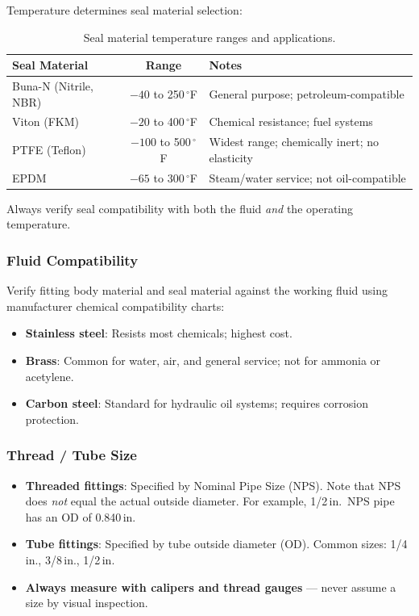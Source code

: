 \documentclass[11pt,letterpaper,twoside,openany]{book}
\begin{document}
Temperature determines seal material selection:

\begin{table}[ht!]
\centering
\small
\begin{tabularx}{\textwidth}{l c X}
  \toprule
  \textbf{Seal Material} & \textbf{Range} & \textbf{Notes} \\
  \midrule
  Buna-N (Nitrile, NBR) & $-40$ to 250\,$^{\circ}$F & General purpose; petroleum-compatible \\
  Viton (FKM) & $-20$ to 400\,$^{\circ}$F & Chemical resistance; fuel systems \\
  PTFE (Teflon) & $-100$ to 500\,$^{\circ}$F & Widest range; chemically inert; no elasticity \\
  EPDM & $-65$ to 300\,$^{\circ}$F & Steam/water service; not oil-compatible \\
  \bottomrule
\end{tabularx}
\caption{Seal material temperature ranges and applications.}
\end{table}

Always verify seal compatibility with both the fluid \emph{and} the operating temperature.

\subsubsection{Fluid Compatibility}

Verify fitting body material and seal material against the working fluid using manufacturer chemical compatibility charts:
\begin{itemize}[nosep,leftmargin=1.5em]
  \item \textbf{Stainless steel}: Resists most chemicals; highest cost.
  \item \textbf{Brass}: Common for water, air, and general service; not for ammonia or acetylene.
  \item \textbf{Carbon steel}: Standard for hydraulic oil systems; requires corrosion protection.
\end{itemize}

\subsubsection{Thread / Tube Size}

\begin{itemize}[nosep,leftmargin=1.5em]
  \item \textbf{Threaded fittings}: Specified by Nominal Pipe Size (NPS). Note that NPS does \emph{not} equal the actual outside diameter. For example, 1/2\,in.\ NPS pipe has an OD of 0.840\,in.
  \item \textbf{Tube fittings}: Specified by tube outside diameter (OD). Common sizes: 1/4\,in., 3/8\,in., 1/2\,in.
  \item \textbf{Always measure with calipers and thread gauges} --- never assume a size by visual inspection.
\end{itemize}
\end{document}
